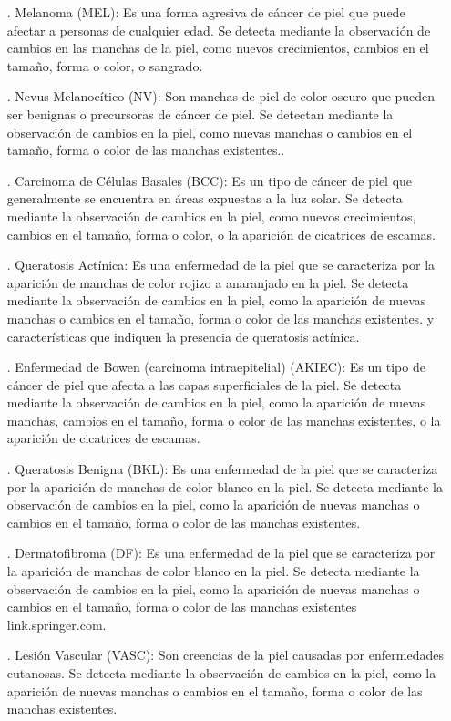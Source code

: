 \begin{enumerate} 
    \item[.] Melanoma (MEL): Es una forma agresiva de cáncer de piel que puede afectar a personas de cualquier edad. Se detecta mediante la observación de cambios 
    en las manchas de la piel, como nuevos crecimientos, cambios en el tamaño, forma o color, o sangrado. 
    \item[.] Nevus Melanocítico (NV): Son manchas de piel de color oscuro que pueden ser benignas o precursoras de cáncer de piel. Se detectan mediante la 
    observación de cambios en la piel, como nuevas manchas o cambios en el tamaño, forma o color de las manchas existentes.. 
    \item[.] Carcinoma de Células Basales (BCC): Es un tipo de cáncer de piel que generalmente se encuentra en áreas expuestas a la luz solar. Se detecta mediante 
    la observación de cambios en la piel, como nuevos crecimientos, cambios en el tamaño, forma o color, o la aparición de cicatrices de escamas.
    \item[.] Queratosis Actínica: Es una enfermedad de la piel que se caracteriza por la aparición de manchas de color rojizo a anaranjado en la piel. Se detecta 
    mediante la observación de cambios en la piel, como la aparición de nuevas manchas o cambios en el tamaño, forma o color de las manchas existentes. 
    y características que indiquen la presencia de queratosis actínica.
    \item[.] Enfermedad de Bowen (carcinoma intraepitelial) (AKIEC): Es un tipo de cáncer de piel que afecta a las capas superficiales de la piel. Se detecta mediante 
    la observación de cambios en la piel, como la aparición de nuevas manchas, cambios en el tamaño, forma o color de las manchas existentes, o la aparición 
    de cicatrices de escamas.
    \item[.] Queratosis Benigna (BKL): Es una enfermedad de la piel que se caracteriza por la aparición de manchas de color blanco en la piel. Se detecta mediante 
    la observación de cambios en la piel, como la aparición de nuevas manchas o cambios en el tamaño, forma o color de las manchas existentes.
    \item[.] Dermatofibroma (DF): Es una enfermedad de la piel que se caracteriza por la aparición de manchas de color blanco en la piel. Se detecta mediante la 
    observación de cambios en la piel, como la aparición de nuevas manchas o cambios en el tamaño, forma o color de las manchas existentes link.springer.com. 
    \item[.] Lesión Vascular (VASC): Son creencias de la piel causadas por enfermedades cutanosas. Se detecta mediante la observación de cambios en la piel, como 
    la aparición de nuevas manchas o cambios en el tamaño, forma o color de las manchas existentes.
\end{enumerate}

